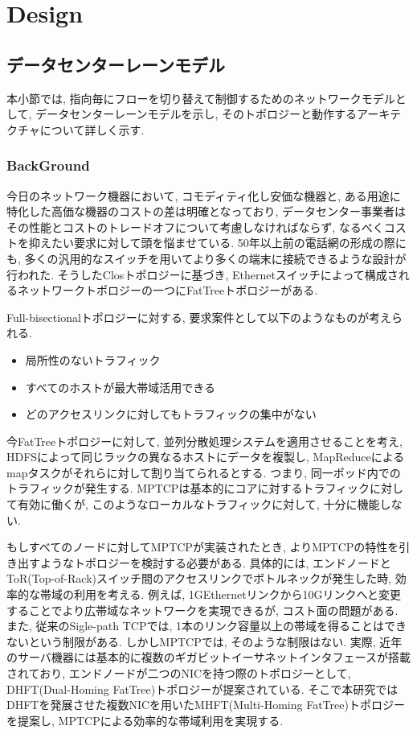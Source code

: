 \section{Design}

\subsection{データセンターレーンモデル}
\label{subsec:lane_model}
本小節では, 指向毎にフローを切り替えて制御するためのネットワークモデルとして, データセンターレーンモデルを示し,
そのトポロジーと動作するアーキテクチャについて詳しく示す. 

\subsubsection{BackGround}

今日のネットワーク機器において, コモディティ化し安価な機器と, ある用途に特化した高価な機器のコストの差は明確となっており,
データセンター事業者はその性能とコストのトレードオフについて考慮しなければならず,
なるべくコストを抑えたい要求に対して頭を悩ませている\cite{fattree}.
50年以上前の電話網の形成の際にも, 多くの汎用的なスイッチを用いてより多くの端末に接続できるような設計が行われた\cite{clos}. 
そうしたClosトポロジーに基づき,
Ethernetスイッチによって構成されるネットワークトポロジーの一つにFatTreeトポロジーがある\cite{fattree}. 

Full-bisectionalトポロジーに対する, 要求案件として以下のようなものが考えられる\cite{improving}.
\begin{itemize}
\item 局所性のないトラフィック
\item すべてのホストが最大帯域活用できる
\item どのアクセスリンクに対してもトラフィックの集中がない
\end{itemize} 

今FatTreeトポロジーに対して, 並列分散処理システムを適用させることを考え, HDFSによって同じラックの異なるホストにデータを複製し,
MapReduceによるmapタスクがそれらに対して割り当てられるとする.
つまり, 同一ポッド内でのトラフィックが発生する.
MPTCPは基本的にコアに対するトラフィックに対して有効に働くが, このようなローカルなトラフィックに対して, 十分に機能しない. 

もしすべてのノードに対してMPTCPが実装されたとき, よりMPTCPの特性を引き出すようなトポロジーを検討する必要がある. 
具体的には, エンドノードとToR(Top-of-Rack)スイッチ間のアクセスリンクでボトルネックが発生した時, 効率的な帯域の利用を考える. 
例えば, 1GEthernetリンクから10Gリンクへと変更することでより広帯域なネットワークを実現できるが, コスト面の問題がある. 
また, 従来のSigle-path TCPでは, 1本のリンク容量以上の帯域を得ることはできないという制限がある. 
しかしMPTCPでは, そのような制限はない. 
実際, 近年のサーバ機器には基本的に複数のギガビットイーサネットインタフェースが搭載されており, エンドノードが二つのNICを持つ際のトポロジーとして,
DHFT(Dual-Homing FatTree)トポロジーが提案されている. 
そこで本研究ではDHFTを発展させた複数NICを用いたMHFT(Multi-Homing FatTree)トポロジーを提案し,
MPTCPによる効率的な帯域利用を実現する. 

